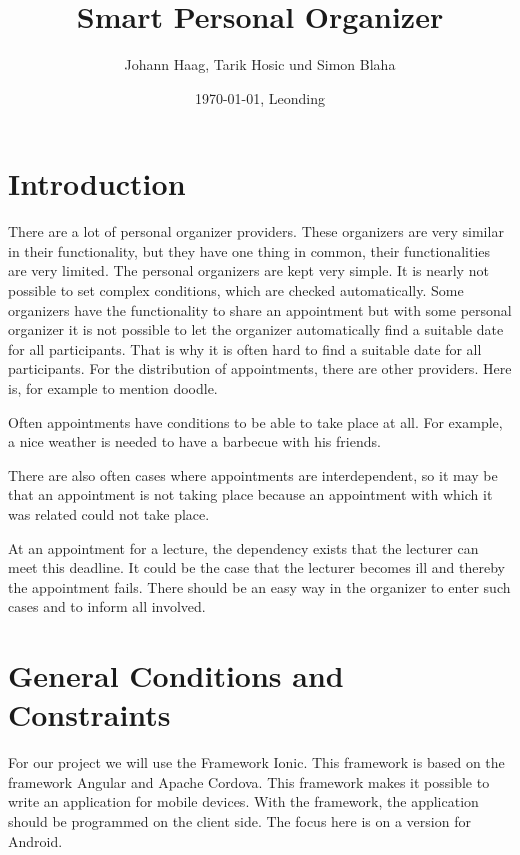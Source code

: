 \documentclass[12pt]{scrartcl}
\title{Smart Personal Organizer}
\author{Johann Haag, Tarik Hosic und Simon Blaha}
\date{\today{}, Leonding}
\begin{document}
    \maketitle
    \pagebreak
    \tableofcontents
    \pagebreak

    \section{Introduction}

        There are a lot of personal organizer providers. 
        These organizers are very similar in their functionality, but they have one thing in common, 
        their functionalities are very limited. The personal organizers are kept very simple. It is
        nearly not possible to set complex conditions, which are checked automatically.  
        Some organizers have the functionality to share an appointment but 
        with some personal organizer it is not possible to let the organizer automatically find a suitable date for all participants.
        That is why it is often hard to find a suitable date for all participants.
        For the distribution of appointments, there are other providers. Here is, for example
        to mention doodle.

        Often appointments have conditions to be able to take place at all. 
        For example, a nice weather is needed to have a barbecue with his friends. 

        There are also often cases where appointments are interdependent, 
        so it may be that an appointment is not taking place because an appointment with 
        which it was related could not take place.
        
        At an appointment for a lecture, the dependency exists that the lecturer
        can meet this deadline. It could be the case that the lecturer becomes ill
        and thereby the appointment fails.
        There should be an easy way in the organizer to enter such cases and
        to inform all involved.
        \pagebreak

    \section{General Conditions and Constraints}

        For our project we will use the Framework Ionic. This framework is based on the framework Angular and Apache Cordova.
        This framework makes it possible to write an application for mobile devices. With the framework, the application should be programmed on the client side.
        The focus here is on a version for Android.
\end{document}
